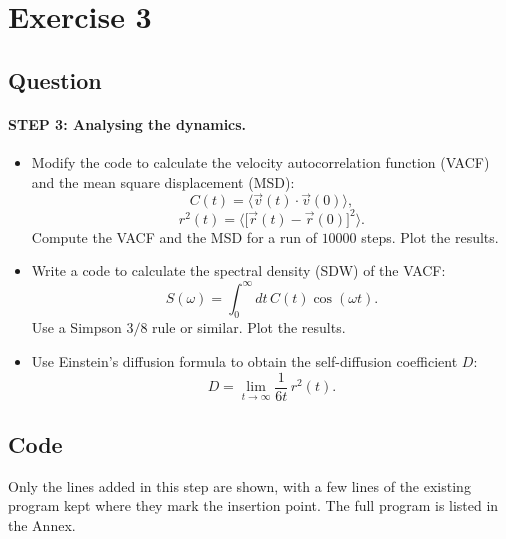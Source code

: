 \documentclass[11pt,a4paper]{article}
\begin{document}
\newpage
\section{Exercise 3}

\subsection{Question}
\paragraph{STEP 3: Analysing the dynamics.}
\begin{itemize}
  \item Modify the code to calculate the velocity autocorrelation function (VACF) and the mean square displacement (MSD):
\begin{equation}
  C(t) = \bigl\langle \vec{v}(t)\cdot\vec{v}(0)\bigr\rangle,
\end{equation}
\begin{equation}
  r^{2}(t) = \bigl\langle \bigl[\vec{r}(t)-\vec{r}(0)\bigr]^{2}\bigr\rangle.
\end{equation}
  Compute the VACF and the MSD for a run of $10000$ steps. Plot the results.
  \item Write a code to calculate the spectral density (SDW) of the VACF:
\begin{equation}
  S(\omega) = \int_0^{\infty} dt\, C(t)\cos(\omega t).
  \label{eq:sdw}
\end{equation}
  Use a Simpson $3/8$ rule or similar. Plot the results.
  \item Use Einstein's diffusion formula to obtain the self-diffusion coefficient $D$:
\begin{equation}
  D = \lim_{t\to\infty}\frac{1}{6t}\, r^{2}(t).
  \label{eq:einstein}
\end{equation}
\end{itemize}

\subsection{Code}
Only the lines added in this step are shown, with a few lines of the existing program kept where they mark the insertion point. The full program is listed in the Annex.


\end{document}
